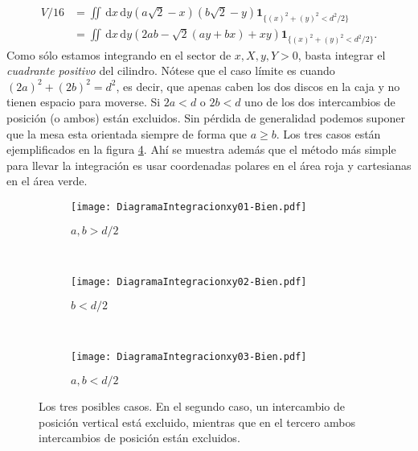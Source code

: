 \documentclass[a4paper,10pt]{article}
\newcommand{\rd}{\, \mathrm{d}}
\newcommand{\indicator}[1]{\mathbf{1}_{ \{   #1 \} } }
\begin{document}
\begin{equation}\label{Volumen01}
\begin{split}
V/16 &=\iint \rd x \rd y (a\sqrt{2}-x)(b\sqrt{2}-y)
\indicator{(x)^2+(y)^2<d^2/2 }\\
&=\iint \rd x \rd y (2ab-\sqrt{2}(ay+bx)+x y)
\indicator{(x)^2+(y)^2<d^2/2 }.
\end{split}
\end{equation}
Como sólo estamos integrando en el sector de $ x,X,y,Y > 0$, basta integrar
el \emph{cuadrante positivo} del cilindro. Nótese que el caso límite
es cuando $(2a)^2+(2b)^2=d^2$, es decir, que apenas caben los dos discos en la
caja y no tienen espacio para moverse. Si $2a<d$ o $2b<d$ uno de los dos 
intercambios de posición (o ambos) están excluidos. Sin pérdida de
generalidad podemos suponer que la mesa esta orientada siempre de forma
que $a \geq b$. Los tres casos están ejemplificados en la figura 
\ref{CasosIntegra}. Ahí se muestra además que el método más simple para
llevar la integración es usar coordenadas polares en el área roja
y cartesianas en el área verde.

\begin{figure}[h]
        \centering
        \begin{subfigure}[b]{0.32\textwidth}
          \centering
          \texttt{[image: DiagramaIntegracionxy01-Bien.pdf]}
          \caption{$a,b>d/2$}
          \label{smallradious}
        \end{subfigure}%
        ~ %
        \begin{subfigure}[b]{0.32\textwidth}
          \centering
          \texttt{[image: DiagramaIntegracionxy02-Bien.pdf]}
          \caption{$b<d/2$}
          \label{mediumradius}
        \end{subfigure}%
        ~ %
        \begin{subfigure}[b]{0.32\textwidth}
          \centering
          \texttt{[image: DiagramaIntegracionxy03-Bien.pdf]}
          \caption{$a,b<d/2$}
          \label{bigradious}
        \end{subfigure}%
        \caption{Los tres posibles casos. En el segundo caso, un
          intercambio de posición vertical está excluido, mientras
          que en el tercero ambos intercambios de posición están excluidos.}
\label{CasosIntegra}
\end{figure}
\end{document}
